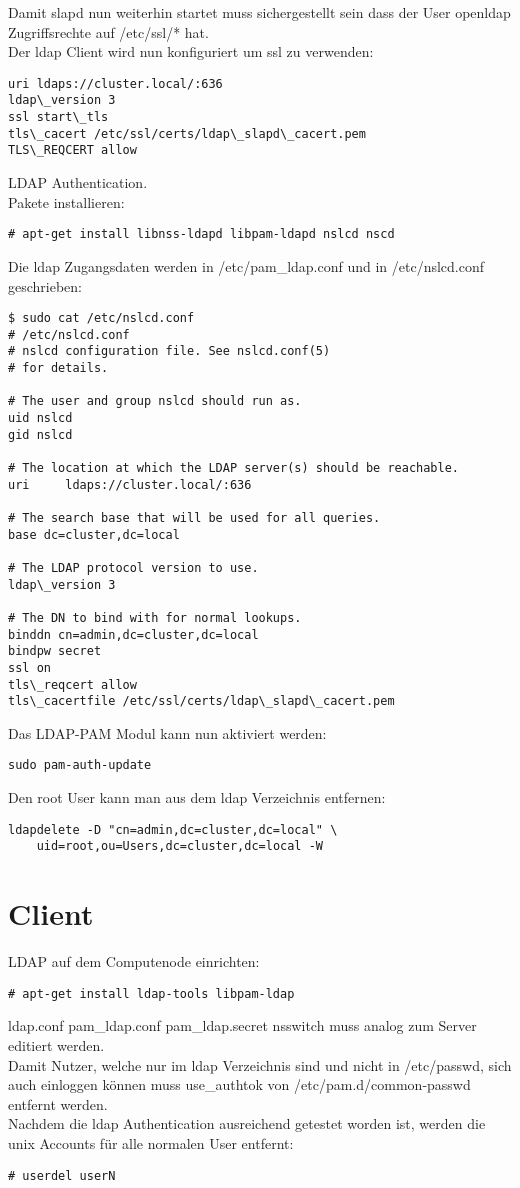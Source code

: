 Damit slapd nun weiterhin startet muss sichergestellt sein dass der User openldap Zugriffsrechte auf /etc/ssl/* hat.\\
Der ldap Client wird nun konfiguriert um ssl zu verwenden:
\begin{lstlisting}[style=Bash]
uri ldaps://cluster.local/:636
ldap\_version 3
ssl start\_tls
tls\_cacert /etc/ssl/certs/ldap\_slapd\_cacert.pem
TLS\_REQCERT allow
\end{lstlisting}
LDAP Authentication.\\
Pakete installieren:
\begin{lstlisting}[style=Bash]
# apt-get install libnss-ldapd libpam-ldapd nslcd nscd
\end{lstlisting}
Die ldap Zugangsdaten werden in /etc/pam\_ldap.conf und in /etc/nslcd.conf geschrieben:
\begin{lstlisting}[style=Bash]
$ sudo cat /etc/nslcd.conf 
# /etc/nslcd.conf
# nslcd configuration file. See nslcd.conf(5)
# for details.

# The user and group nslcd should run as.
uid nslcd
gid nslcd

# The location at which the LDAP server(s) should be reachable.
uri     ldaps://cluster.local/:636

# The search base that will be used for all queries.
base dc=cluster,dc=local

# The LDAP protocol version to use.
ldap\_version 3

# The DN to bind with for normal lookups.
binddn cn=admin,dc=cluster,dc=local
bindpw secret
ssl on
tls\_reqcert allow
tls\_cacertfile /etc/ssl/certs/ldap\_slapd\_cacert.pem
\end{lstlisting}
Das LDAP-PAM Modul kann nun aktiviert werden: 
\begin{lstlisting}[style=Bash]
sudo pam-auth-update
\end{lstlisting}
Den root User kann man aus dem ldap Verzeichnis entfernen:
\begin{lstlisting}[style=Bash]
ldapdelete -D "cn=admin,dc=cluster,dc=local" \
	uid=root,ou=Users,dc=cluster,dc=local -W
\end{lstlisting}
\section{Client}
LDAP auf dem Computenode einrichten:
\begin{lstlisting}[style=Bash]
# apt-get install ldap-tools libpam-ldap
\end{lstlisting}
{ldap.conf pam\_ldap.conf pam\_ldap.secret nsswitch} muss analog zum Server editiert werden.\\
Damit Nutzer, welche nur im ldap Verzeichnis sind und nicht in /etc/passwd, sich auch einloggen können muss use\_authtok von /etc/pam.d/common-passwd entfernt werden.\\
Nachdem die ldap Authentication ausreichend getestet worden ist, werden die unix Accounts für alle normalen User entfernt: 
\begin{lstlisting}[style=Bash]
# userdel userN
\end{lstlisting}
